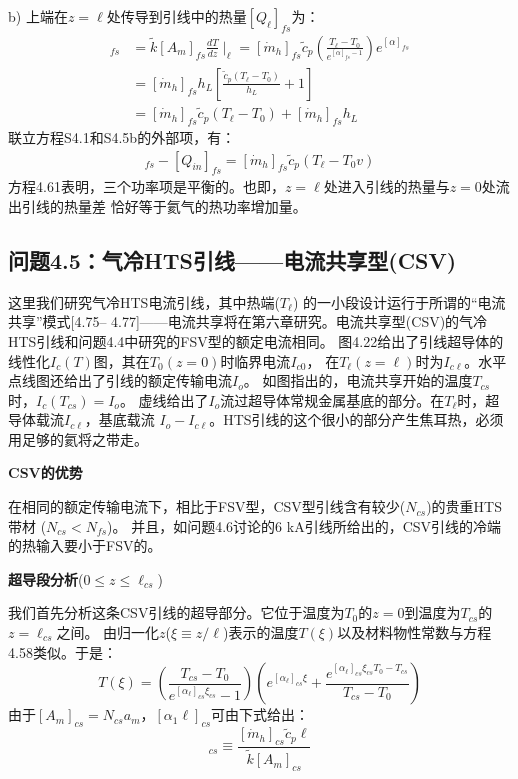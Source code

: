 b) 上端在$z=\ell$处传导到引线中的热量$[Q_{\ell}]_{fs}$为：
\begin{align*}
[Q_\ell]_{fs}&=\tilde{k}[A_m]_{fs}\frac{dT}{dz}\mid_\ell=[\dot{m}_h]_{fs}\tilde{c}_p(\frac{T_\ell-T_0}{e^{[\alpha]_{fs}-1}})e^{[\alpha]_{fs}}\\ \tag{S4.5a}
&=[\dot{m}_h]_{fs}h_L\left[\frac{\tilde{c}_p(T_\ell-T_0)}{h_L}+1\right]\\
&=[\dot{m}_h]_{fs}\tilde{c}_p(T_\ell-T_0)+[\dot{m}_h]_{fs}h_L\tag{S4.5b}
\end{align*}
联立方程S4.1和S4.5b的外部项，有：
\begin{align*}%
[Q_\ell]_{fs}-[Q_{in}]_{fs}=[\dot{m}_h]_{fs}\tilde{c}_p(T_\ell-T_0v)\tag{4.61}
\end{align*}
方程4.61表明，三个功率项是平衡的。也即，$z=\ell$处进入引线的热量与$z=0$处流出引线的热量差
恰好等于氦气的热功率增加量。

\subsection{问题4.5：气冷HTS引线——电流共享型(CSV)}

这里我们研究气冷HTS电流引线，其中热端($T_\ell$) 的一小段设计运行于所谓的“电流共享”模式[4.75–
4.77]——电流共享将在第六章研究。电流共享型(CSV)的气冷HTS引线和问题4.4中研究的FSV型的额定电流相同。
图4.22给出了引线超导体的线性化$I_c(T)$图，其在$T_0 (z = 0)$时临界电流$I_{c0}$，
在$T_\ell(z=\ell)$时为$I_{c\ell}$。水平点线图还给出了引线的额定传输电流$I_o$。
如图指出的，电流共享开始的温度$T_{cs}$时，$I_c(T_{cs})=I_o$。
虚线给出了$I_o$流过超导体常规金属基底的部分。在$T_\ell$时，超导体载流$I_{c\ell}$，基底载流
$I_o-I_{c\ell}$。HTS引线的这个很小的部分产生焦耳热，必须用足够的氦将之带走。

\textbf{CSV的优势}

在相同的额定传输电流下，相比于FSV型，CSV型引线含有较少($N_{cs}$)的贵重HTS带材 ($N_{cs} <N_{fs}$)。
并且，如问题4.6讨论的6 kA引线所给出的，CSV引线的冷端的热输入要小于FSV的。

\textbf{超导段分析}($0\le z\le \ell_{cs}$)

我们首先分析这条CSV引线的超导部分。它位于温度为$T_0$的$z = 0$到温度为$T_{cs}$的$z =\ell_{cs}$之间。
由归一化$z$($\xi\equiv z/\ell$)表示的温度$T(\xi)$以及材料物性常数与方程4.58类似。于是：
\begin{equation}%
T(\xi)=(\frac{T_{cs}-T_0}{e^{[\alpha_\ell]_{cs}\xi_{cs}}-1})(e^{[\alpha_\ell]_{cs}\xi}+\frac{e^{[\alpha_\ell]_{cs}\xi_{cs}T_0-T_{cs}}}{T_{cs}-T_0})
\end{equation}
由于$[A_m]_{cs}=N_{cs}a_m$，$[\alpha_{1}\ell]_{cs}$可由下式给出：
\begin{equation}%
[\alpha_\ell]_{cs}\equiv\frac{[\dot{m}_h]_{cs}\tilde{c}_p\ell}{\tilde{k}[A_m]_{cs}}
\end{equation}

